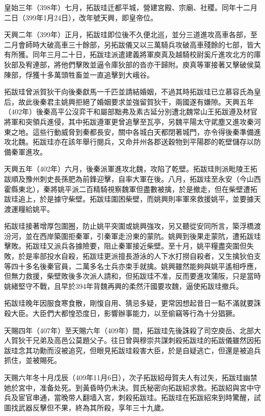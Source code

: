 皇始三年（398年）七月，拓跋珪迁都平城，營建宮殿、宗廟、社稷。同年十二月二日（399年1月24日），改年號天興，即皇帝位。

天興二年（399年）正月，拓跋珪即位後不久便北巡，並分三道進攻高車各部，至二月會師時大破高車三十餘部，另拓跋儀又以三萬騎兵攻破高車殘餘的七部，皆大有所獲。同年三月二十日，拓跋珪派遣建義將軍庾真及越騎校尉奚斤進攻北方的庫狄部及宥連部，將他們擊敗並逼令庫狄部的沓亦干歸附。庾真等軍接著又擊破侯莫陳部，俘獲十多萬頭牲畜並一直追擊到大峨谷。

拓跋珪曾派賀狄干向後秦獻馬一千匹並請結婚姻，不過其時拓跋珪已立慕容氏為皇后，故此後秦君主姚興拒絕了婚姻要求並強留賀狄干，兩國遂有嫌隙。天興五年（402年）後秦高平公沒弈干和屬部黜弗及素古延分別遭北魏常山王拓跋遵及材官將軍和突領兵進侵，其中拓跋遵軍更曾追擊至瓦亭，另魏平陽太守貮塵又進攻秦河東之地。這些行動威脅到秦都長安，關中各城白天都閉著城門，亦令得後秦準備進攻北魏。拓跋珪亦在該年舉行閱兵，又命并州各郡送穀物到平陽郡的乾壁儲存以防備秦軍進攻。

天興五年（402年）六月，後秦派軍進攻北魏，攻陷了乾壁。拓跋珪則派毗陵王拓跋順及豫州刺史長孫肥為前鋒迎擊，自率大軍在後。八月，拓跋珪至永安（今山西霍縣東北），秦將姚平派二百精騎視察魏軍但盡數被擒，於是撤走，但在柴壁遭拓跋珪追上，於是據守柴壁。拓跋珪圍困柴壁，而姚興則率軍來救援姚平，並要據天渡運糧給姚平。

拓跋珪接著增厚包圍圈，防止姚平突圍或姚興強攻，另又聽從安同所言，築浮橋渡汾河，並在西岸築圍拒秦軍，引秦軍走汾東的蒙阬。姚興到後果走蒙阬，遭拓跋珪擊敗。拓跋珪又派兵各據險要，阻止秦軍接近柴壁。至十月，姚平糧盡突圍但失敗，於是率部投水自殺，拓跋珪更派擅長游泳的人下水打撈自殺者，又生擒狄伯支等四十多名後秦官員，二萬多名士兵亦束手就擒。姚興雖然能夠與姚平遙相呼應，但無力救援，柴壁敗後多次派人請和，但拓跋珪不准，反而要進攻蒲阪，只是當時姚緒堅守不戰，且早於394年背魏再興的柔然汗國要攻魏，逼使拓跋珪撤兵。

拓跋珪晚年因服食寒食散，剛愎自用、猜忌多疑，更常因想起昔日一點不滿就要誅殺大臣。大臣們大都惶恐度日，影響辦事能力，以至偷竊等行為十分猖獗。

天賜四年（407年）至天賜六年（409年）間，拓跋珪先後誅殺了司空庾岳、北部大人賀狄干兄弟及高邑公莫題父子。往日曾與穆崇共謀刺殺拓跋珪的拓跋儀雖然因拓跋珪念其功勳而沒被追究，但眼見拓跋珪殺害大臣，於是自疑逃亡，但還是被追兵抓住，並被賜死。

天赐六年冬十月戊辰（409年11月6日），次子拓跋紹母賀夫人有过失，拓跋珪幽禁她於宮中，准备处死。到黃昏時仍未決。賀氏秘密向拓跋紹求救。拓跋紹與宮中守兵及宦官串通，當晚带人翻墙入宮，刺殺拓跋珪。拓跋珪在拓跋紹來到時驚醒，試圖找武器反擊但不果，終為其所殺，享年三十九歲。

